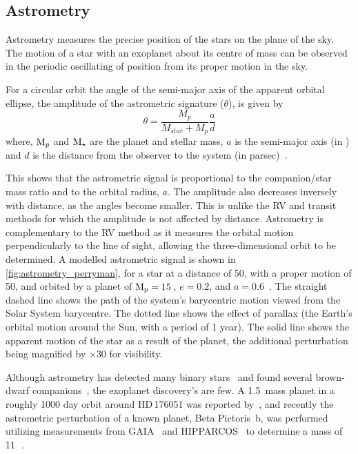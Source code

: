 \subsection{Astrometry}

\label{subsec:astrometry}
Astrometry measures the precise position of the stars on the plane of the sky.
The motion of a star with an exoplanet about its centre of mass can be observed in the periodic oscillating of position from its proper motion in the sky.

For a circular orbit the angle of the semi-major axis of the apparent orbital ellipse, the amplitude of the astrometric signature ($\theta$), is given by
\begin{equation}
\theta = \frac{M_{p}}{M_{star} + M_{p}} \frac{a}{d}
\end{equation}
where, $\textrm{M}_{p}$ and $\textrm{M}_{\star}$ are the planet and stellar mass, $a$ is the semi-major axis (in \AU) and $d$ is the distance from the observer to the system (in parsec)~\citep{perryman_exoplanet_2011}.

This shows that the astrometric signal is proportional to the companion/star mass ratio and to the orbital radius, $a$.
The amplitude also decreases inversely with distance, as the angles become smaller.
This is unlike the {RV} and transit methods for which the amplitude is not affected by distance.
Astrometry is complementary to the {RV} method as it measures the orbital motion perpendicularly to the line of sight, allowing the three-dimensional orbit to be determined.
A modelled astrometric signal is shown in \cref{fig:astrometry_perryman}, for a star at a distance of 50\pc, with a proper motion of 50\masperyr{}, and orbited by a planet of $\textrm{M}_{p} = 15$\,\Mjup{}, $e = 0.2$, and $a = 0.6$\AU~\citep{perryman_extrasolar_2000}.
The straight dashed line shows the path of the system's barycentric motion viewed from the Solar System barycentre.
The dotted line shows the effect of parallax (the Earth's orbital motion around the Sun, with a period of 1 year).
The solid line shows the apparent motion of the star as a result of the planet, the additional perturbation being magnified by $\times 30$ for visibility.

Although astrometry has detected many binary stars~\citep[e.g.][]{gontcharov_new_2000} and found several brown-dwarf companions~\citep[e.g.][]{sahlmann_search_2011}, the exoplanet discovery's are few.
A 1.5\,\Mjup{} mass planet in a roughly 1000 day orbit around {HD\,176051} was reported by~\citet{muterspaugh_phases_2010}, and recently the astrometric perturbation of a known planet, {Beta Pictoris~b}, was performed utilizing measurements from {GAIA}~\citep{collaboration_gaia_2016a} and {HIPPARCOS}~\citep{esa_hipparcos_1997} to determine a mass of 11\,\Mjup~\citep{snellen_mass_2018}.

